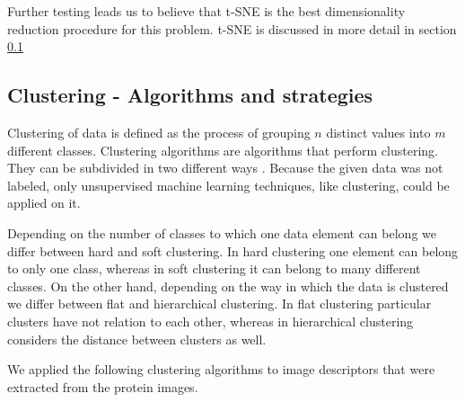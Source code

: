 \documentclass[journal]{vgtc}       %
\newcommand{\todo}[1]{\textcolor{red}{\textbf{TODO:} #1}}
\begin{document}
Further testing leads us to believe that t-SNE is the best dimensionality reduction procedure for this problem. t-SNE is discussed in more detail in section \ref{sec:clusteringa}


\subsection{Clustering - Algorithms and strategies }\label{sec:clusteringa}
Clustering of data is defined as the process of grouping $n$ distinct values into $m$ different classes. Clustering algorithms are algorithms that perform clustering. They can be subdivided in two different ways \cite{iir}.
Because the given data was not labeled, only unsupervised machine learning techniques, like clustering, could be applied on it. 

Depending on the number of classes to which one data element can belong we differ between hard and soft clustering. In hard clustering one element can belong to only one class, whereas in soft clustering it can belong to many different classes. 
On the other hand, depending on the way in which the data is clustered we differ between flat and hierarchical clustering. In flat clustering particular clusters have not relation to each other, whereas in hierarchical clustering considers the distance between clusters as well.

We applied the following clustering algorithms to image descriptors that were extracted from the protein images.
\end{document}
